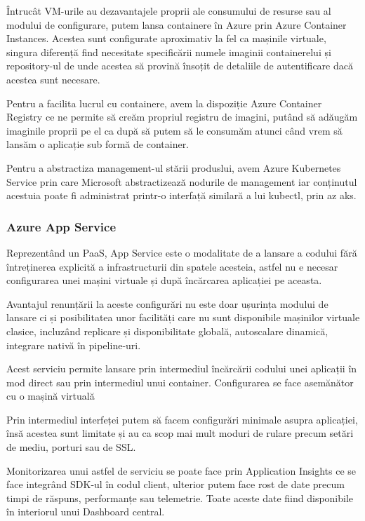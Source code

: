 Întrucât VM-urile au dezavantajele proprii ale consumului de resurse sau al modului
de configurare, putem lansa containere în Azure prin Azure Container Instances.
Acestea sunt configurate aproximativ la fel ca mașinile virtuale, singura diferență
find necesitate specificării numele imaginii containerelui și repository-ul de unde
acestea să provină însoțit de detaliile de autentificare dacă acestea sunt necesare.

Pentru a facilita lucrul cu containere, avem la dispoziție Azure Container Registry
ce ne permite să creăm propriul registru de imagini, putând să adăugăm imaginile proprii
pe el ca după să putem să le consumăm atunci când vrem să lansăm o aplicație sub formă
de container.

Pentru a abstractiza management-ul stării produslui, avem Azure Kubernetes Service
prin care Microsoft abstractizează nodurile de management iar conținutul acestuia
poate fi administrat printr-o interfață similară a lui kubectl, prin az aks.


\subsubsection{Azure App Service}

Reprezentând un PaaS, App Service este o modalitate de a lansare a codului fără
întreținerea explicită a infrastructurii din spatele acesteia, astfel nu e necesar
configurarea unei mașini virtuale și după încărcarea aplicației pe aceasta.

Avantajul renunțării la aceste configurări nu este doar ușurința modului de
lansare ci și posibilitatea unor facilități care nu sunt disponibile mașinilor
virtuale clasice, incluzând replicare și disponibilitate globală, autoscalare dinamică,
integrare nativă în pipeline-uri.

Acest serviciu permite lansare prin intermediul încărcării codului unei aplicații
în mod direct sau prin intermediul unui container. Configurarea se face asemănător
cu o mașină virtuală

Prin intermediul interfeței putem să facem configurări minimale asupra aplicației,
însă acestea sunt limitate și au ca scop mai mult moduri de rulare precum
setări de mediu, porturi sau de SSL.

Monitorizarea unui astfel de serviciu se poate face prin Application Insights
ce se face integrând SDK-ul în codul client, ulterior putem face rost de date
precum timpi de răspuns, performanțe sau telemetrie. Toate aceste date fiind disponibile
în interiorul unui Dashboard central.

